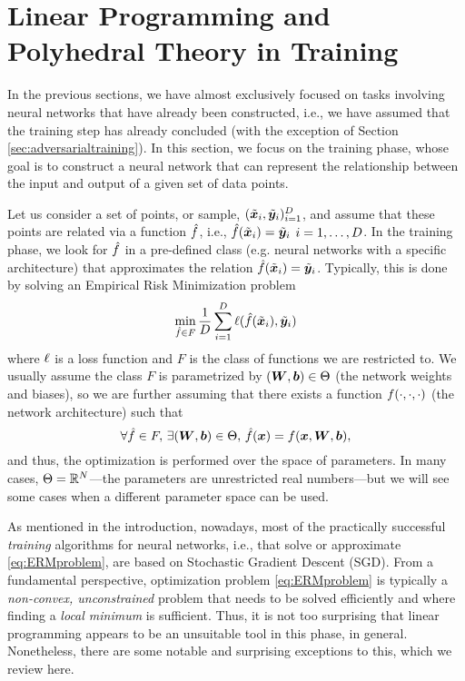 

\section{Linear Programming and Polyhedral Theory in Training}\label{sec:training}

In the previous sections, we have almost exclusively focused on tasks involving neural networks that have already been constructed, i.e., we have assumed that the training step has already concluded (with the exception of Section \ref{sec:adversarialtraining}). In this section, we focus on the training phase, whose goal is to construct a neural network that can represent the relationship between the input and output of a given set of data points.

Let us consider a set of points, or sample, $(\tilde{{\bm{x}}}_i,\tilde{{\bm{y}}}_i)_{i=1}^D$, and assume that these points are related via a function $\hat{f}$, i.e., $\hat{f}(\tilde{{\bm{x}}}_i) = \tilde{{\bm{y}}}_i$ $i=1,\ldots, D$. In the training phase, we look for $\hat{f}$ in a pre-defined class (e.g. neural networks with a specific architecture) that approximates the relation $\hat{f}(\tilde{{\bm{x}}}_i) = \tilde{{\bm{y}}}_i$. Typically, this is done by solving an Empirical Risk Minimization problem
\begin{equation}
    \label{eq:ERMproblem}
    \min_{\hat{f} \in F} \frac{1}{D} \sum_{i=1}^D \ell(\hat{f}(\tilde{{\bm{x}}}_i), \tilde{{\bm{y}}}_i)
\end{equation}
where $\ell$ is a loss function and $F$ is the class of functions we are restricted to. We usually assume the class $F$ is parametrized by $({\bm{W}},{\bm{b}})\in \Theta$ (the network weights and biases), so we are further assuming that there exists a function $f(\cdot,\cdot,\cdot)$ (the network architecture) such that
\[\forall \hat{f} \in F,\, \exists ({\bm{W}},{\bm{b}})\in \Theta,\, \hat{f}({\bm{x}}) = f({\bm{x}},{\bm{W}},{\bm{b}}),\]
and thus, the optimization is performed over the space of parameters. In many cases, $\Theta = \mathbb{R}^N$---the parameters are unrestricted real numbers---but we will see some cases when a different parameter space can be used.

As mentioned in the introduction, nowadays, most of the practically successful \emph{training} algorithms for neural networks, i.e., that solve or approximate \eqref{eq:ERMproblem}, are based on Stochastic Gradient Descent (SGD). From a fundamental perspective, optimization problem \eqref{eq:ERMproblem} is typically a \emph{non-convex, unconstrained} problem that needs to be solved efficiently and where finding a \emph{local minimum} is sufficient. Thus, it is not too surprising that linear programming appears to be an unsuitable tool in this phase, in general. Nonetheless, there are some notable and surprising exceptions to this, which we review here.

